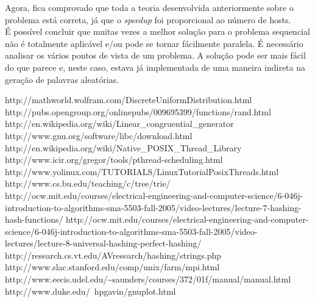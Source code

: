 \documentclass[a4paper]{article}
\begin{document}
\indent Agora, fica comprovado que toda a teoria desenvolvida anteriormente sobre o problema está correta, já que o \emph{speedup} foi proporcional ao número de hosts.\\
\indent É possível concluir que muitas vezes a melhor solução para o problema sequencial não é totalmente aplicável e/ou pode se tornar fácilmente paralela. É necessário analisar os vários pontos de vista de um problema. A solução pode ser mais fácil do que parece e, neste caso, estava já implementada de uma maneira indireta na geração de palavras aleatórias.

\begin{thebibliography}{99}

	http://mathworld.wolfram.com/DiscreteUniformDistribution.html
	http://pubs.opengroup.org/onlinepubs/009695399/functions/rand.html
	http://en.wikipedia.org/wiki/Linear\_congruential\_generator
	http://www.gnu.org/software/libc/download.html
	http://en.wikipedia.org/wiki/Native\_POSIX\_Thread\_Library
	http://www.icir.org/gregor/tools/pthread-scheduling.html
	http://www.yolinux.com/TUTORIALS/LinuxTutorialPosixThreads.html
	http://www.cs.bu.edu/teaching/c/tree/trie/
	http://ocw.mit.edu/courses/electrical-engineering-and-computer-science/6-046j-introduction-to-algorithms-sma-5503-fall-2005/video-lectures/lecture-7-hashing-hash-functions/
	http://ocw.mit.edu/courses/electrical-engineering-and-computer-science/6-046j-introduction-to-algorithms-sma-5503-fall-2005/video-lectures/lecture-8-universal-hashing-perfect-hashing/
	http://research.cs.vt.edu/AVresearch/hashing/strings.php
	 http://www.slac.stanford.edu/comp/unix/farm/mpi.html
	 http://www.eecis.udel.edu/\~{}saunders/courses/372/01f/manual/manual.html
	http://www.duke.edu/~hpgavin/gnuplot.html
	
\end{thebibliography}
\end{document}
